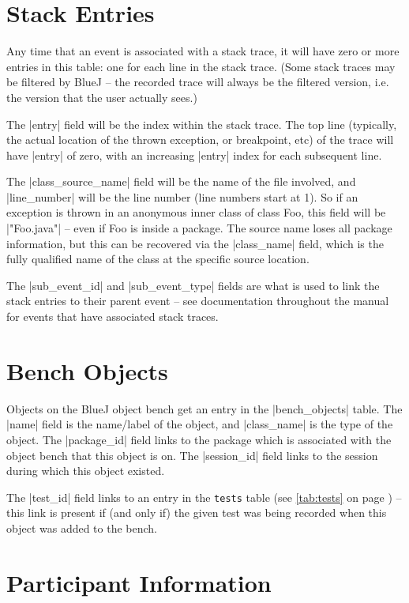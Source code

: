 \documentclass{report}
\newcommand{\myref}[1]{\autoref{#1} on page \pageref*{#1}}
\newcommand{\tabref}[1]{\lstinline|#1| table (see \myref{tab:#1})}
\begin{document}
\section{Stack Entries}


Any time that an event is associated with a stack trace, it will have
zero or more entries in this table: one for each line in the stack
trace.  (Some stack traces may be filtered by BlueJ -- the recorded
trace will always be the filtered version, i.e. the version that the
user actually sees.)

The |entry| field will be the index within the stack trace.  The top
line (typically, the actual location of the thrown exception, or
breakpoint, etc) of the trace will have |entry| of zero, with an
increasing |entry| index for each subsequent line.

The |class_source_name| field will be the name of the file involved,
and |line_number| will be the line number (line numbers start at 1).
So if an exception is thrown in an anonymous inner class of class Foo,
this field will be |"Foo.java"| -- even if Foo is inside a package.
The source name loses all package information, but this can be
recovered via the |class_name| field, which is the fully qualified
name of the class at the specific source location.

The |sub_event_id| and |sub_event_type| fields are what is used to
link the stack entries to their parent event -- see documentation
throughout the manual for events that have associated stack traces.
\section{Bench Objects}


Objects on the BlueJ object bench get an entry in the |bench_objects|
table.  The |name| field is the name/label of the object, and
|class_name| is the type of the object.  The |package_id| field links
to the package which is associated with the object bench that this
object is on.  The |session_id| field links to the session during
which this object existed.

The |test_id| field links to an entry in the \tabref{tests} -- this
link is present if (and only if) the given test was being recorded
when this object was added to the bench.

\section{Participant Information}
\label{sec:views}
\end{document}
